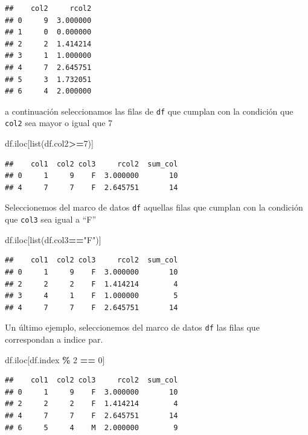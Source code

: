 \documentclass[
]{book}
\newenvironment{Shaded}{\begin{snugshade}}{\end{snugshade}}
\newcommand{\BuiltInTok}[1]{#1}
\newcommand{\DecValTok}[1]{\textcolor[rgb]{0.00,0.00,0.81}{#1}}
\newcommand{\NormalTok}[1]{#1}
\newcommand{\OperatorTok}[1]{\textcolor[rgb]{0.81,0.36,0.00}{\textbf{#1}}}
\newcommand{\StringTok}[1]{\textcolor[rgb]{0.31,0.60,0.02}{#1}}
\theoremstyle{definition}
\theoremstyle{definition}
\theoremstyle{definition}
\theoremstyle{definition}
\theoremstyle{remark}
\begin{document}
\begin{verbatim}
##    col2     rcol2
## 0     9  3.000000
## 1     0  0.000000
## 2     2  1.414214
## 3     1  1.000000
## 4     7  2.645751
## 5     3  1.732051
## 6     4  2.000000
\end{verbatim}

a continuación seleccionamos las filas de \texttt{df} que cumplan con la condición que \texttt{col2} sea mayor o igual que 7

\begin{Shaded}
\begin{Highlighting}[]
\NormalTok{df.iloc[}\BuiltInTok{list}\NormalTok{(df.col2}\OperatorTok{\textgreater{}=}\DecValTok{7}\NormalTok{)] }
\end{Highlighting}
\end{Shaded}

\begin{verbatim}
##    col1  col2 col3     rcol2  sum_col
## 0     1     9    F  3.000000       10
## 4     7     7    F  2.645751       14
\end{verbatim}

Seleccionemos del marco de datos \texttt{df} aquellas filas que cumplan con la condición que \texttt{col3} sea igual a ``F''

\begin{Shaded}
\begin{Highlighting}[]
\NormalTok{df.iloc[}\BuiltInTok{list}\NormalTok{(df.col3}\OperatorTok{==}\StringTok{"F"}\NormalTok{)]  }
\end{Highlighting}
\end{Shaded}

\begin{verbatim}
##    col1  col2 col3     rcol2  sum_col
## 0     1     9    F  3.000000       10
## 2     2     2    F  1.414214        4
## 3     4     1    F  1.000000        5
## 4     7     7    F  2.645751       14
\end{verbatim}

Un último ejemplo, seleccionemos del marco de datos \texttt{df} las filas que correspondan a indice par.

\begin{Shaded}
\begin{Highlighting}[]
\NormalTok{df.iloc[df.index }\OperatorTok{\%} \DecValTok{2} \OperatorTok{==} \DecValTok{0}\NormalTok{]  }
\end{Highlighting}
\end{Shaded}

\begin{verbatim}
##    col1  col2 col3     rcol2  sum_col
## 0     1     9    F  3.000000       10
## 2     2     2    F  1.414214        4
## 4     7     7    F  2.645751       14
## 6     5     4    M  2.000000        9
\end{verbatim}
\end{document}
